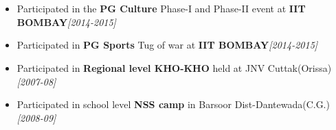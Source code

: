 \\[-0.9cm]\\
\begin{itemize}
        \item Participated in the \textbf{PG Culture} Phase-I and Phase-II event at \textbf{IIT BOMBAY}\hfill \emph{[2014-2015]} \\[-0.6cm]
	\item Participated in \textbf{PG Sports} Tug of war at \textbf{IIT BOMBAY}\hfill \emph{[2014-2015]}\\[-0.6cm]
	\item Participated in \textbf{Regional level KHO-KHO} held at JNV Cuttak(Orissa) \hfill \emph{[2007-08]} \\[-0.6cm]
	\item Participated in school level \textbf{NSS camp} in Barsoor Dist-Dantewada(C.G.)\hfill \emph{[2008-09]} \\[-0.6cm]
\end{itemize}
	

